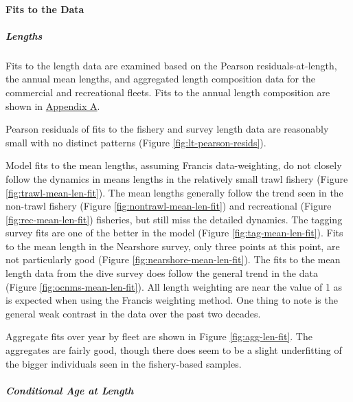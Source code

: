 \documentclass[11pt,
  english,
  letterpaper,
]{article}
\begin{document}
\hypertarget{fits-to-the-data}{%
\paragraph{Fits to the Data}\label{fits-to-the-data}}

\hypertarget{lengths}{%
\subparagraph{Lengths}\label{lengths}}

Fits to the length data are examined based on the Pearson residuals-at-length, the annual mean lengths, and aggregated length composition data for the commercial and recreational fleets. Fits to the annual length composition are shown in \protect\hyperlink{app_a}{Appendix A}.

Pearson residuals of fits to the fishery and survey length data are reasonably small with no distinct patterns (Figure \ref{fig:lt-pearson-resids}).

Model fits to the mean lengths, assuming Francis data-weighting, do not closely follow the dynamics in means lengths in the relatively small trawl fishery (Figure \ref{fig:trawl-mean-len-fit}). The mean lengths generally follow the trend seen in the non-trawl fishery (Figure \ref{fig:nontrawl-mean-len-fit}) and recreational (Figure \ref{fig:rec-mean-len-fit}) fisheries, but still miss the detailed dynamics. The tagging survey fits are one of the better in the model (Figure \ref{fig:tag-mean-len-fit}). Fits to the mean length in the Nearshore survey, only three points at this point, are not particularly good (Figure \ref{fig:nearshore-mean-len-fit}). The fits to the mean length data from the dive survey does follow the general trend in the data (Figure \ref{fig:ocnms-mean-len-fit}). All length weighting are near the value of 1 as is expected when using the Francis weighting method. One thing to note is the general weak contrast in the data over the past two decades.

Aggregate fits over year by fleet are shown in Figure \ref{fig:agg-len-fit}. The aggregates are fairly good, though there does seem to be a slight underfitting of the bigger individuals seen in the fishery-based samples.

\hypertarget{conditional-age-at-length}{%
\subparagraph{Conditional Age at Length}\label{conditional-age-at-length}}
\end{document}
